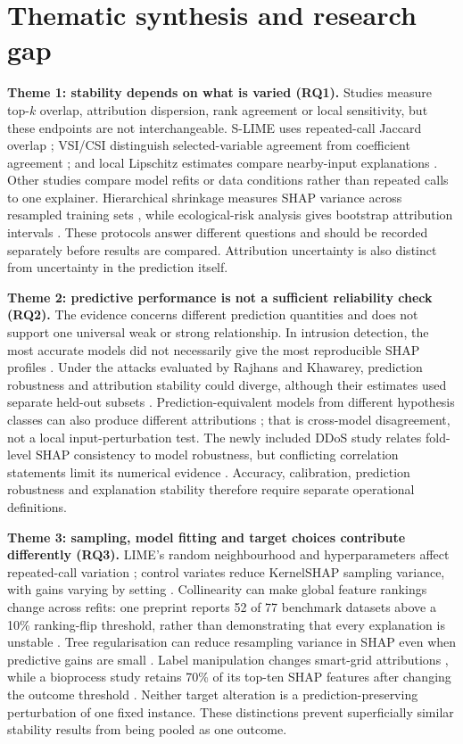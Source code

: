\section{Thematic synthesis and research gap}\label{sec:synth}
\textbf{Theme 1: stability depends on what is varied (RQ1).} Studies measure top-$k$ overlap, attribution dispersion, rank agreement or local sensitivity, but these endpoints are not interchangeable. S-LIME uses repeated-call Jaccard overlap \cite{S08}; VSI/CSI distinguish selected-variable agreement from coefficient agreement \cite{S10}; and local Lipschitz estimates compare nearby-input explanations \cite{S01,S05}. Other studies compare model refits or data conditions rather than repeated calls to one explainer. Hierarchical shrinkage measures SHAP variance across resampled training sets \cite{S83}, while ecological-risk analysis gives bootstrap attribution intervals \cite{S81}. These protocols answer different questions and should be recorded separately before results are compared. Attribution uncertainty is also distinct from uncertainty in the prediction itself.

\textbf{Theme 2: predictive performance is not a sufficient reliability check (RQ2).} The evidence concerns different prediction quantities and does not support one universal weak or strong relationship. In intrusion detection, the most accurate models did not necessarily give the most reproducible SHAP profiles \cite{S51}. Under the attacks evaluated by Rajhans and Khawarey, prediction robustness and attribution stability could diverge, although their estimates used separate held-out subsets \cite{S59}. Prediction-equivalent models from different hypothesis classes can also produce different attributions \cite{S75}; that is cross-model disagreement, not a local input-perturbation test. The newly included DDoS study relates fold-level SHAP consistency to model robustness, but conflicting correlation statements limit its numerical evidence \cite{S84}. Accuracy, calibration, prediction robustness and explanation stability therefore require separate operational definitions.

\textbf{Theme 3: sampling, model fitting and target choices contribute differently (RQ3).} LIME's random neighbourhood and hyperparameters affect repeated-call variation \cite{S08,S10}; control variates reduce KernelSHAP sampling variance, with gains varying by setting \cite{S18}. Collinearity can make global feature rankings change across refits: one preprint reports 52 of 77 benchmark datasets above a 10\% ranking-flip threshold, rather than demonstrating that every explanation is unstable \cite{S43}. Tree regularisation can reduce resampling variance in SHAP even when predictive gains are small \cite{S83}. Label manipulation changes smart-grid attributions \cite{S80}, while a bioprocess study retains 70\% of its top-ten SHAP features after changing the outcome threshold \cite{S82}. Neither target alteration is a prediction-preserving perturbation of one fixed instance. These distinctions prevent superficially similar stability results from being pooled as one outcome.

